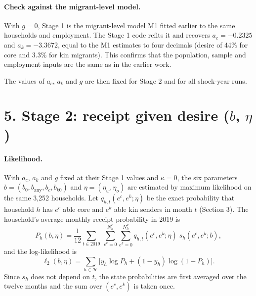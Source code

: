 \documentclass[11pt]{article}
\begin{document}
\paragraph{Check against the migrant-level model.} With $g = 0$, Stage 1 is the migrant-level model M1 fitted earlier to the same households and employment. The Stage 1 code refits it and recovers $a_c = -0.2325$ and $a_k = -3.3672$, equal to the M1 estimates to four decimals (desire of 44\% for core and 3.3\% for kin migrants). This confirms that the population, sample and employment inputs are the same as in the earlier work.

The values of $a_c$, $a_k$ and $g$ are then fixed for Stage 2 and for all shock-year runs.

\section*{5. Stage 2: receipt given desire ($b$, $\eta$)}

\paragraph{Likelihood.} With $a_c$, $a_k$ and $g$ fixed at their Stage 1 values and $\kappa = 0$, the six parameters $b = (b_0, b_{\text{any}}, b_c, b_{k0})$ and $\eta = (\eta_w, \eta_o)$ are estimated by maximum likelihood on the same 3,252 households. Let $q_{h,t}(e^c, e^k; \eta)$ be the exact probability that household $h$ has $e^c$ able core and $e^k$ able kin senders in month $t$ (Section 3). The household's average monthly receipt probability in 2019 is
\begin{equation}
P_h(b, \eta) = \frac{1}{12} \sum_{t \in 2019} \ \sum_{e^c = 0}^{N^c_h} \sum_{e^k = 0}^{N^k_h} q_{h,t}(e^c, e^k; \eta)\; s_h(e^c, e^k; b),
\end{equation}
and the log-likelihood is
\begin{equation}
\ell_2(b, \eta) = \sum_{h \in \mathcal{H}} \Big[y_h \log P_h + (1 - y_h) \log(1 - P_h)\Big].
\end{equation}
Since $s_h$ does not depend on $t$, the state probabilities are first averaged over the twelve months and the sum over $(e^c, e^k)$ is taken once.
\end{document}
